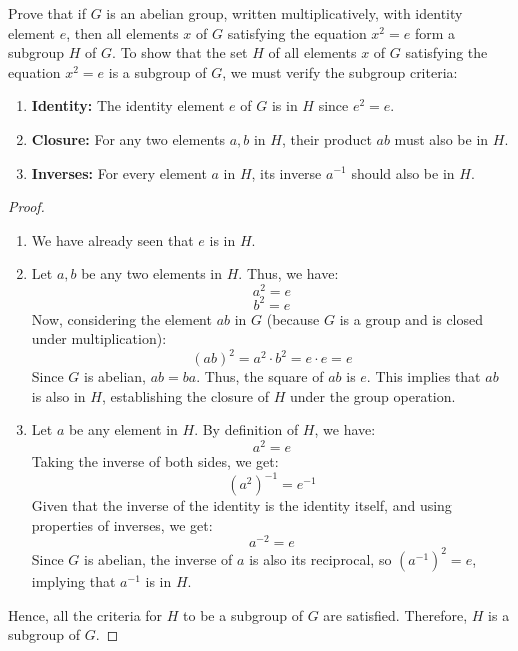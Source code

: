 \documentclass[12pt]{amsart}
\theoremstyle{definition}
\numberwithin{equation}{section}
\theoremstyle{plain}
\begin{document}
    \begin{exercise}{47} Prove that if $G$ is an abelian group, written multiplicatively, with identity element $e$, then all elements $x$ of $G$ satisfying the equation $x^2 = e$ form a subgroup $H$ of $G$.
        To show that the set \( H \) of all elements \( x \) of \( G \) satisfying the equation \( x^2 = e \) is a subgroup of \( G \), we must verify the subgroup criteria:

        \begin{enumerate}
            \item \textbf{Identity:} The identity element \( e \) of \( G \) is in \( H \) since \( e^2 = e \).
            \item \textbf{Closure:} For any two elements \( a, b \) in \( H \), their product \( ab \) must also be in \( H \). 
            \item \textbf{Inverses:} For every element \( a \) in \( H \), its inverse \( a^{-1} \) should also be in \( H \).
        \end{enumerate}
        
        \begin{proof} $ $ \newline
        \begin{enumerate}
            \item We have already seen that \( e \) is in \( H \).
            
            \item Let \( a, b \) be any two elements in \( H \). Thus, we have:
            \[ a^2 = e \]
            \[ b^2 = e \]
            Now, considering the element \( ab \) in \( G \) (because \( G \) is a group and is closed under multiplication):
            \[ (ab)^2 = a^2 \cdot b^2 = e \cdot e = e \]
            Since \( G \) is abelian, \( ab = ba \). Thus, the square of \( ab \) is \( e \). This implies that \( ab \) is also in \( H \), establishing the closure of \( H \) under the group operation.
            
            \item Let \( a \) be any element in \( H \). By definition of \( H \), we have:
            \[ a^2 = e \]
            Taking the inverse of both sides, we get:
            \[ (a^2)^{-1} = e^{-1} \]
            Given that the inverse of the identity is the identity itself, and using properties of inverses, we get:
            \[ a^{-2} = e \]
            Since \( G \) is abelian, the inverse of \( a \) is also its reciprocal, so \( (a^{-1})^2 = e \), implying that \( a^{-1} \) is in \( H \).
        \end{enumerate}
        
        Hence, all the criteria for \( H \) to be a subgroup of \( G \) are satisfied. Therefore, \( H \) is a subgroup of \( G \).
        \end{proof}
    \end{exercise}
                    
\end{document}

